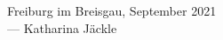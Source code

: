 



\vspace{0.5cm}

\begin{flushright}
	{
		\small
		Freiburg im Breisgau, September 2021\\
		--- Katharina Jäckle
	}
\end{flushright}
